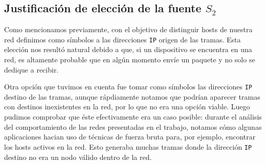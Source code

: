 \subsection{Justificación de elección de la fuente $S_{2}$} 
Como mencionamos previamente, con el objetivo de distinguir hosts de nuestra red definimos como símbolos a las direcciones \texttt{IP} origen de las tramas. Esta elección nos resultó natural debido a que, si un dispositivo se encuentra en una red, es altamente probable que en algún momento envíe un paquete y no solo se dedique a recibir.

Otra opción que tuvimos en cuenta fue tomar como símbolos las direcciones \texttt{IP} destino de las tramas, aunque rápdiamente notamos que podrían aparecer tramas con destinos inexistentes en la red, por lo que no era una opción viable. Luego pudimos comprobar que éste efectivamente era un caso posible: durante el análisis del comportamiento de las redes presentadas en el trabajo, notamos cómo algunas aplicaciones hacian uso de técnicas de fuerza bruta para, por ejemplo, encontrar los hosts activos en la red. Esto generaba muchas tramas donde la dirección \texttt{IP} destino no era un nodo válido dentro de la red.

